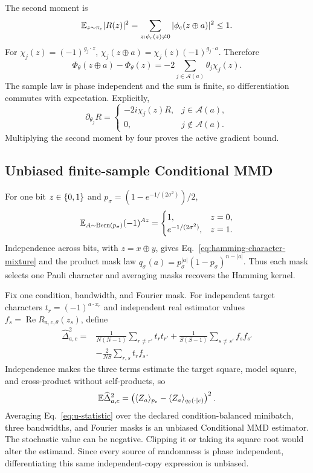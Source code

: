 The second moment is
\begin{equation}
 \mathbb{E}_{z\sim\pi_c}|R(z)|^2
 =\sum_{z:\phi_c(z)\ne0}|\phi_c(z\oplus a)|^2\leq1.
\end{equation}
For $\chi_j(z)=(-1)^{g_j\cdot z}$,
$\chi_j(z\oplus a)=\chi_j(z)(-1)^{g_j\cdot a}$.  Therefore
\begin{equation}
 \Phi_\theta(z\oplus a)-\Phi_\theta(z)
 =-2\sum_{j\in\mathcal A(a)}\theta_j\chi_j(z).
\end{equation}
The sample law is phase independent and the sum is finite, so differentiation
commutes with expectation.  Explicitly,
\begin{equation}
 \partial_{\theta_j}R=
 \begin{cases}
 -2i\chi_j(z)R,&j\in\mathcal A(a),\\
 0,&j\notin\mathcal A(a).
 \end{cases}
\end{equation}
Multiplying the second moment by four proves the active gradient bound.

\subsection{Unbiased finite-sample Conditional MMD}

For one bit $z\in\{0,1\}$ and
$p_\sigma=(1-e^{-1/(2\sigma^2)})/2$,
\begin{equation}
 \mathbb{E}_{A\sim\operatorname{Bern}(p_\sigma)}(-1)^{Az}
 =\begin{cases}1,&z=0,\\e^{-1/(2\sigma^2)},&z=1.\end{cases}
\end{equation}
Independence across bits, with $z=x\oplus y$, gives
Eq.~\eqref{eq:hamming-character-mixture} and the product mask law
$q_\sigma(a)=p_\sigma^{|a|}(1-p_\sigma)^{n-|a|}$.  Thus each mask selects one
Pauli character and averaging masks recovers the Hamming kernel.

Fix one condition, bandwidth, and Fourier mask.  For independent target
characters $t_r=(-1)^{a\cdot x_r}$ and independent real estimator values
$f_s=\operatorname{Re}R_{a,c,\theta}(z_s)$, define
\begin{align}
 \widehat\Delta_{a,c}^{2}={}&
 \frac{1}{N(N-1)}\sum_{r\ne r'}t_rt_{r'}
 +\frac{1}{S(S-1)}\sum_{s\ne s'}f_sf_{s'}\nonumber\\
 &-\frac{2}{NS}\sum_{r,s}t_rf_s.
 \label{eq:u-statistic}
\end{align}
Independence makes the three terms estimate the target square, model square,
and cross-product without self-products, so
\begin{equation}
 \mathbb{E}\widehat\Delta_{a,c}^{2}
 =\left(\langle Z_a\rangle_{p_c}
 -\langle Z_a\rangle_{q_\theta(\cdot\mid c)}\right)^2.
\end{equation}
Averaging Eq.~\eqref{eq:u-statistic} over the declared condition-balanced
minibatch, three bandwidths, and Fourier masks is an unbiased Conditional MMD
estimator.  The stochastic value can be negative.  Clipping it or taking its
square root would alter the estimand.  Since every source of randomness is
phase independent, differentiating this same independent-copy expression is
unbiased.

